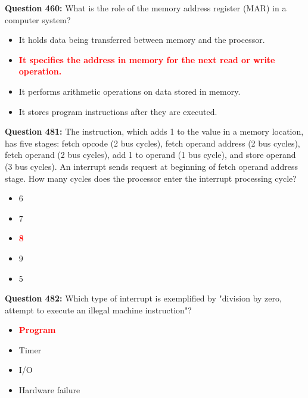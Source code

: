 \documentclass[12pt,a4paper]{article}
\begin{document}
\textbf{Question 460:} What is the role of the memory address register (MAR) in a computer system?

\begin{itemize}
    \item[\textbf{A.}] It holds data being transferred between memory and the processor.
    \item[\textbf{B.}] \textcolor{red}{\textbf{It specifies the address in memory for the next read or write operation.}}
    \item[\textbf{C.}] It performs arithmetic operations on data stored in memory.
    \item[\textbf{D.}] It stores program instructions after they are executed.
\end{itemize}

\vspace{0.5cm}

\textbf{Question 481:} The instruction, which adds 1 to the value in a memory location, has five stages: fetch opcode (2 bus cycles), fetch operand address (2 bus cycles), fetch operand (2 bus cycles), add 1 to operand (1 bus cycle), and store operand (3 bus cycles). An interrupt sends request at beginning of fetch operand address stage. How many cycles does the processor enter the interrupt processing cycle?

\begin{itemize}
    \item[\textbf{A.}] 6
    \item[\textbf{B.}] 7
    \item[\textbf{C.}] \textcolor{red}{\textbf{8}}
    \item[\textbf{D.}] 9
    \item[\textbf{E.}] 5
\end{itemize}

\vspace{0.5cm}

\textbf{Question 482:} Which type of interrupt is exemplified by "division by zero, attempt to execute an illegal machine instruction"?

\begin{itemize}
    \item[\textbf{A.}] \textcolor{red}{\textbf{Program}}
    \item[\textbf{B.}] Timer
    \item[\textbf{C.}] I/O
    \item[\textbf{D.}] Hardware failure
\end{itemize}
\end{document}
